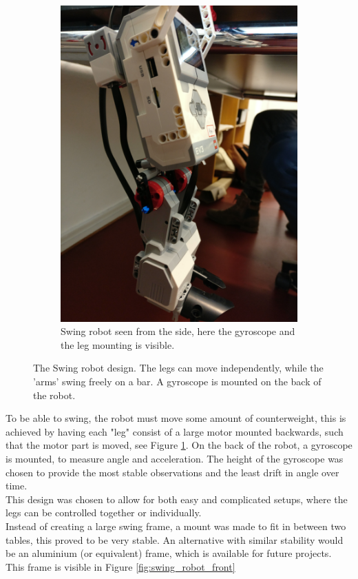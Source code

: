 \documentclass[11pt, a4paper]{article}
\begin{document}
\begin{figure}[H]
\begin{subfigure}{.48\textwidth}
	\end{subfigure}
	\begin{subfigure}{.48\textwidth}
		\centering
		\includegraphics[width=1\linewidth]{images/swing_robot_side}
		\caption{Swing robot seen from the side, here the gyroscope and the leg mounting is visible.}
		\label{fig:swing_robot_side}
	\end{subfigure}%
	\caption{The Swing robot design. The legs can move independently, while the 'arms' swing freely on a bar. A gyroscope is mounted on the back of the robot.}
	\label{fig:swing_robot}
\end{figure}

To be able to swing, the robot must move some amount of counterweight, this is achieved by having each "leg" consist of a large motor mounted backwards, such that the motor part is moved, see Figure \ref{fig:swing_robot_side}.
On the back of the robot, a gyroscope is mounted, to measure angle and acceleration. The height of the gyroscope was chosen to provide the most stable observations and the least drift in angle over time. \\
This design was chosen to allow for both easy and complicated setups, where the legs can be controlled together or individually. \\
Instead of creating a large swing frame, a mount was made to fit in between two tables, this proved to be very stable. An alternative with similar stability would be an aluminium (or equivalent) frame, which is available for future projects. This frame is visible in Figure \ref{fig:swing_robot_front}
\end{document}

